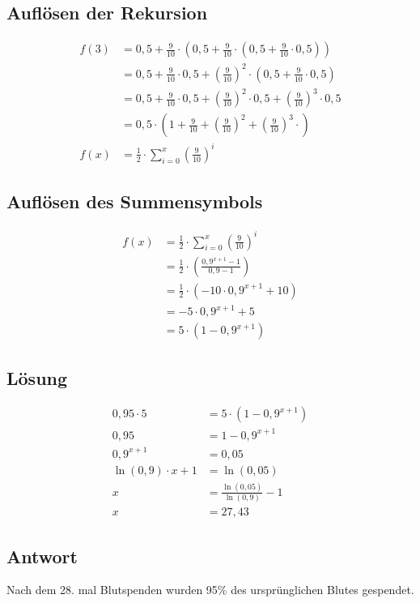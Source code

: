 \documentclass[a4paper,9pt]{scrartcl}
\begin{document}
    \subsection{Auflösen der Rekursion}
        \begin{align}
             f(3) &= 0{,}5 + \frac{9}{10} \cdot (0{,}5 + \frac{9}{10} \cdot (0{,}5 + \frac{9}{10} \cdot 0{,}5))\\
                  &= 0{,}5 + \frac{9}{10} \cdot 0{,}5 + (\frac{9}{10})^2 \cdot (0{,}5 + \frac{9}{10} \cdot 0{,}5)\\
                  &= 0{,}5 + \frac{9}{10} \cdot 0{,}5 + (\frac{9}{10})^2 \cdot 0{,}5 + (\frac{9}{10})^3 \cdot 0{,}5\\
                  &= 0{,}5 \cdot (1 + \frac{9}{10} + (\frac{9}{10})^2 + (\frac{9}{10})^3 \cdot )\\
              f(x)&= \frac{1}{2} \cdot \sum_{i=0}^{x} (\frac{9}{10})^i
        \end{align}

    \subsection{Auflösen des Summensymbols}
        \begin{align}
            f(x) &= \frac{1}{2} \cdot \sum_{i=0}^{x} (\frac{9}{10})^i\\
                 &= \frac{1}{2}\cdot (\frac{0{,}9^{x+1} - 1}{0{,}9 - 1})\\
                 &= \frac{1}{2}\cdot (-10 \cdot 0{,}9^{x+1} + 10)\\
                 &= -5 \cdot 0{,}9^{x+1} + 5\\
                 &= 5 \cdot (1 - 0{,}9^{x+1})
        \end{align}

    \subsection{Lösung}
        \begin{align}
            0{,}95 \cdot 5 &= 5 \cdot (1- 0{,}9^{x+1})\\
                    0{,}95 &= 1 - 0{,}9^{x+1}\\
              0{,}9^{x+1} &= 0{,}05\\
    \ln(0{,}9) \cdot {x+1} &= \ln(0{,}05) \\
                     x  &= \frac{\ln(0{,}05)}{\ln(0{,}9)} - 1\\
                     x  &= 27{,}43
        \end{align}
    \subsection{Antwort}
        Nach dem 28. mal Blutspenden wurden 95\% des ursprünglichen Blutes
        gespendet.
\end{document}
